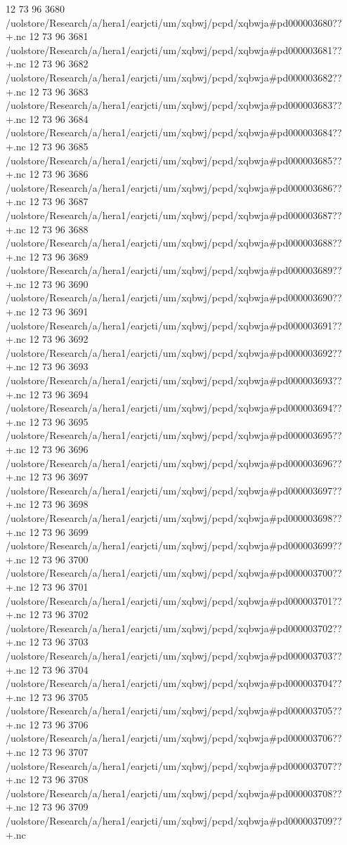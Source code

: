 12 73 96
3680
/uolstore/Research/a/hera1/earjcti/um/xqbwj/pcpd/xqbwja#pd000003680??+.nc
12 73 96
3681
/uolstore/Research/a/hera1/earjcti/um/xqbwj/pcpd/xqbwja#pd000003681??+.nc
12 73 96
3682
/uolstore/Research/a/hera1/earjcti/um/xqbwj/pcpd/xqbwja#pd000003682??+.nc
12 73 96
3683
/uolstore/Research/a/hera1/earjcti/um/xqbwj/pcpd/xqbwja#pd000003683??+.nc
12 73 96
3684
/uolstore/Research/a/hera1/earjcti/um/xqbwj/pcpd/xqbwja#pd000003684??+.nc
12 73 96
3685
/uolstore/Research/a/hera1/earjcti/um/xqbwj/pcpd/xqbwja#pd000003685??+.nc
12 73 96
3686
/uolstore/Research/a/hera1/earjcti/um/xqbwj/pcpd/xqbwja#pd000003686??+.nc
12 73 96
3687
/uolstore/Research/a/hera1/earjcti/um/xqbwj/pcpd/xqbwja#pd000003687??+.nc
12 73 96
3688
/uolstore/Research/a/hera1/earjcti/um/xqbwj/pcpd/xqbwja#pd000003688??+.nc
12 73 96
3689
/uolstore/Research/a/hera1/earjcti/um/xqbwj/pcpd/xqbwja#pd000003689??+.nc
12 73 96
3690
/uolstore/Research/a/hera1/earjcti/um/xqbwj/pcpd/xqbwja#pd000003690??+.nc
12 73 96
3691
/uolstore/Research/a/hera1/earjcti/um/xqbwj/pcpd/xqbwja#pd000003691??+.nc
12 73 96
3692
/uolstore/Research/a/hera1/earjcti/um/xqbwj/pcpd/xqbwja#pd000003692??+.nc
12 73 96
3693
/uolstore/Research/a/hera1/earjcti/um/xqbwj/pcpd/xqbwja#pd000003693??+.nc
12 73 96
3694
/uolstore/Research/a/hera1/earjcti/um/xqbwj/pcpd/xqbwja#pd000003694??+.nc
12 73 96
3695
/uolstore/Research/a/hera1/earjcti/um/xqbwj/pcpd/xqbwja#pd000003695??+.nc
12 73 96
3696
/uolstore/Research/a/hera1/earjcti/um/xqbwj/pcpd/xqbwja#pd000003696??+.nc
12 73 96
3697
/uolstore/Research/a/hera1/earjcti/um/xqbwj/pcpd/xqbwja#pd000003697??+.nc
12 73 96
3698
/uolstore/Research/a/hera1/earjcti/um/xqbwj/pcpd/xqbwja#pd000003698??+.nc
12 73 96
3699
/uolstore/Research/a/hera1/earjcti/um/xqbwj/pcpd/xqbwja#pd000003699??+.nc
12 73 96
3700
/uolstore/Research/a/hera1/earjcti/um/xqbwj/pcpd/xqbwja#pd000003700??+.nc
12 73 96
3701
/uolstore/Research/a/hera1/earjcti/um/xqbwj/pcpd/xqbwja#pd000003701??+.nc
12 73 96
3702
/uolstore/Research/a/hera1/earjcti/um/xqbwj/pcpd/xqbwja#pd000003702??+.nc
12 73 96
3703
/uolstore/Research/a/hera1/earjcti/um/xqbwj/pcpd/xqbwja#pd000003703??+.nc
12 73 96
3704
/uolstore/Research/a/hera1/earjcti/um/xqbwj/pcpd/xqbwja#pd000003704??+.nc
12 73 96
3705
/uolstore/Research/a/hera1/earjcti/um/xqbwj/pcpd/xqbwja#pd000003705??+.nc
12 73 96
3706
/uolstore/Research/a/hera1/earjcti/um/xqbwj/pcpd/xqbwja#pd000003706??+.nc
12 73 96
3707
/uolstore/Research/a/hera1/earjcti/um/xqbwj/pcpd/xqbwja#pd000003707??+.nc
12 73 96
3708
/uolstore/Research/a/hera1/earjcti/um/xqbwj/pcpd/xqbwja#pd000003708??+.nc
12 73 96
3709
/uolstore/Research/a/hera1/earjcti/um/xqbwj/pcpd/xqbwja#pd000003709??+.nc
